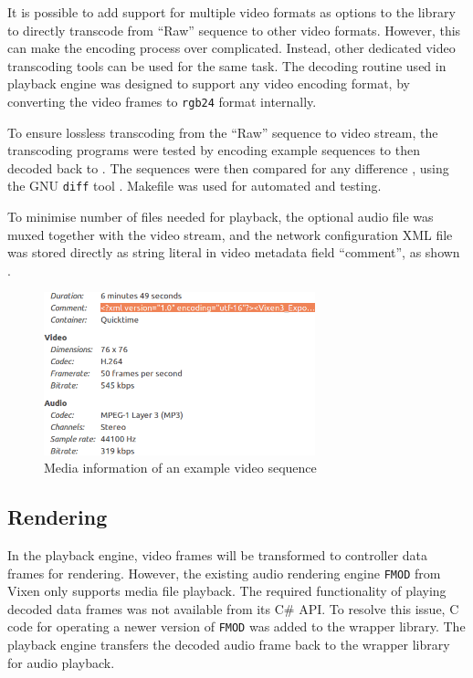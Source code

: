  It is possible to add support for multiple video formats as options to the  library to directly transcode from ``Raw'' sequence to other video formats. However, this can make the encoding process  over complicated. Instead, other dedicated video transcoding tools can be used for the same task. The decoding routine used in playback engine was designed to support any video encoding format, by converting the video frames to \texttt{rgb24} format internally.

To ensure lossless transcoding from the ``Raw'' sequence to  video stream, the transcoding programs were tested by encoding example sequences to  then decoded back to . The  sequences were then compared for any difference , using the GNU \texttt{diff} tool \cite{diff}. Makefile was used for automated  and testing.

To minimise number of files needed for playback, the optional audio file was muxed together with the video stream, and the network configuration XML file was stored directly as  string literal in  video metadata field  ``comment'', as shown  .

\begin{figure}[t]
  \centering
  \includegraphics[width=0.7\textwidth]{Figs/video_info.png}
  \caption{\footnotesize Media information of an example video sequence}
  \label{fig:video-info}
\end{figure}

\subsection{Rendering}

In the playback engine, video frames will be transformed to controller data frames for rendering. However, the existing audio rendering engine \texttt{FMOD} from Vixen only supports media file playback. The required functionality of playing decoded  data frames was not available from its C\# API. To resolve this issue, C code for operating a newer version of \texttt{FMOD} was added to the wrapper library. The playback engine transfers the decoded audio frame back to the wrapper library for audio playback.

